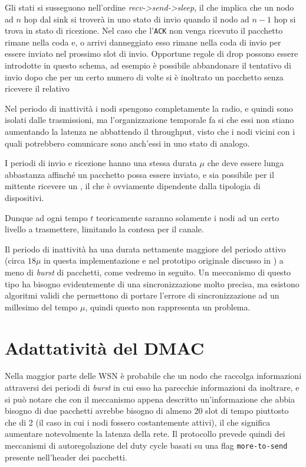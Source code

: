 \documentclass[twoside,11pt,a4paper,italian,openany]{book}
\begin{document}
Gli stati si susseguono nell'ordine \emph{recv->send->sleep}, il che implica
che un nodo ad $n$ hop dal sink si troverà in uno stato di invio quando il nodo ad $n-1$ 
hop si trova in stato di ricezione. 
Nel caso che l'\texttt{ACK}  non venga ricevuto il pacchetto rimane nella coda e, o
arrivi danneggiato esso rimane nella coda di invio per essere 
inviato nel prossimo slot di invio. 
Opportune regole di drop possono essere introdotte in questo schema, ad esempio è possibile 
abbandonare il tentativo di invio dopo che per un certo numero di volte si è inoltrato un pacchetto senza ricevere il relativo \ack
 
Nel periodo di inattività i nodi spengono completamente la radio, e quindi sono isolati dalle 
trasmissioni, ma l'organizzazione temporale fa si che essi non stiano aumentando la latenza ne abbattendo il throughput, visto che i nodi vicini con i quali potrebbero comunicare sono anch'essi in uno stato di analogo. 

I periodi di invio e ricezione hanno una stessa durata $\mu$ che deve essere lunga abbastanza 
affinché un pacchetto possa essere inviato, e  sia possibile per il mittente ricevere un  
 \ack, il che è ovviamente dipendente dalla tipologia di dispositivi. 
 
Dunque ad ogni tempo $t$ teoricamente saranno solamente i nodi ad un certo livello a 
trasmettere, limitando la contesa per il canale. 

Il periodo di inattività ha una durata nettamente maggiore del periodo attivo (circa $18\mu$ in questa implementazione e nel prototipo originale discusso in \cite{DMAC}) a meno di 
\emph{burst} di pacchetti, come vedremo in seguito.
Un meccanismo di questo tipo ha bisogno evidentemente di una sincronizzazione molto precisa, ma 
esistono algoritmi validi che permettono di portare l'errore di sincronizzazione ad un millesimo 
del tempo $\mu$, quindi questo non rappresenta un problema. 

\section{Adattatività del DMAC}
Nella maggior parte delle WSN è probabile che un nodo che raccolga informazioni attraversi dei
periodi di \emph{burst} in cui esso ha parecchie informazioni da inoltrare, e si può notare che 
con il meccanismo appena descritto un'informazione che abbia bisogno di due pacchetti avrebbe 
bisogno di almeno 20 slot di tempo piuttosto che di 2 (il caso in cui i nodi fossero 
costantemente attivi), il che significa aumentare notevolmente la latenza della rete. 
Il protocollo prevede quindi dei meccanismi di autoregolazione del duty cycle basati su una flag 
\texttt{more-to-send} presente nell'header dei pacchetti.
\end{document}
